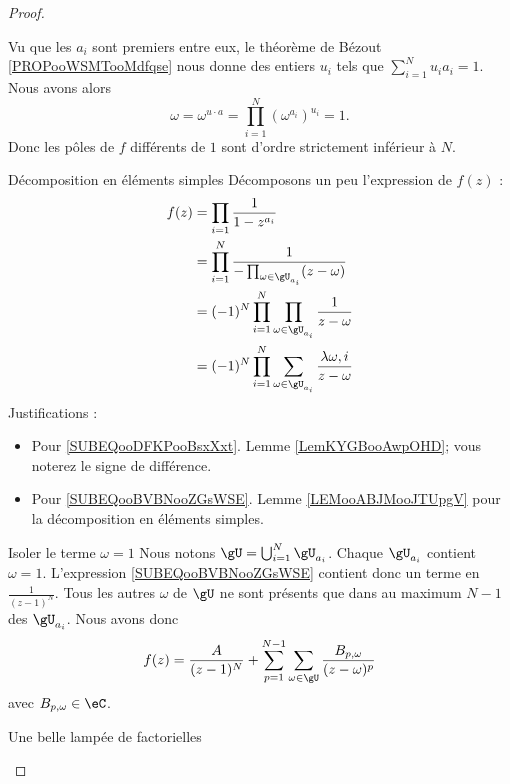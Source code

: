 \begin{proof}
\begin{subproof}
		Vu que les \( a_i\) sont premiers entre eux, le théorème de Bézout \ref{PROPooWSMTooMdfqse} nous donne des entiers \( u_i\) tels que \( \sum_{i=1}^Nu_ia_i=1\). Nous avons alors
		\begin{equation}
			\omega=\omega^{u\cdot a}=\prod_{i=1}^N(\omega^{a_i})^{u_i}=1.
		\end{equation}
		Donc les pôles de \( f\) différents de \( 1\) sont d'ordre strictement inférieur à \( N\).
		\item[Décomposition en éléments simples]
		Décomposons un peu l'expression de \( f(z)\) :
		\begin{subequations}
			\begin{align}
				f(z) & =\prod_{i=1}\frac{1}{ 1-z^{a_i} }                                                                                  \\
				     & =\prod_{i=1}^N\frac{1}{ -\prod_{\omega\in \gU_{a_i}}(z-\omega) }     \label{SUBEQooDFKPooBsxXxt}                   \\
				     & =(-1)^N\prod_{i=1}^{N}\prod_{\omega\in \gU_{a_i}}\frac{1}{ z-\omega }                                              \\
				     & =(-1)^N\prod_{i=1}^N\sum_{\omega\in \gU_{a_i}}\frac{ \lambda{\omega,i} }{ z-\omega }   \label{SUBEQooBVBNooZGsWSE}
			\end{align}
		\end{subequations}
		Justifications :
		\begin{itemize}
			\item Pour \eqref{SUBEQooDFKPooBsxXxt}. Lemme \ref{LemKYGBooAwpOHD}; vous noterez le signe de différence.
			\item Pour \eqref{SUBEQooBVBNooZGsWSE}. Lemme \ref{LEMooABJMooJTUpgV} pour la décomposition en éléments simples.
		\end{itemize}
		\item[Isoler le terme \( \omega=1\)]
		Nous notons \( \gU=\bigcup_{i=1}^N\gU_{a_i}\). Chaque \( \gU_{a_i}\) contient \( \omega=1\). L'expression \eqref{SUBEQooBVBNooZGsWSE} contient donc un terme en \( \frac{1}{ (z-1)^N }\). Tous les autres \( \omega\) de \( \gU\) ne sont présents que dans au maximum \( N-1\) des \( \gU_{a_i}\). Nous avons donc
		\begin{equation}        \label{EQooUUEPooQrVASA}
			f(z)=\frac{ A }{ (z-1)^N }+\sum_{p=1}^{N-1}\sum_{\omega\in \gU}\frac{ B_{p,\omega} }{ (z-\omega)^p }
		\end{equation}
		avec \( B_{p,\omega}\in \eC\).
		\item[Une belle lampée de factorielles]

\end{subproof}
\end{proof}
